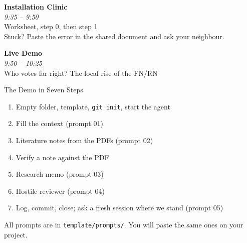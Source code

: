 \documentclass[svgnames,x11names,dvipsnames]{beamer}
\begin{document}

\begin{frame}[plain]
  \centering
  \vfill
  {\Huge \textbf{\textcolor{titleblue}{Installation Clinic}}}\\[0.4cm]
  {\Large \textit{9:35 -- 9:50}}\\[0.3cm]
  {\large Worksheet, step 0, then step 1}\\[0.4cm]
  {\small Stuck? Paste the error in the shared document and ask your neighbour.}
  \vfill
\end{frame}


\begin{frame}[plain]
  \centering
  \vfill
  {\Huge \textbf{\textcolor{titleblue}{Live Demo}}}\\[0.4cm]
  {\Large \textit{9:50 -- 10:25}}\\[0.3cm]
  {\large Who votes far right? The local rise of the FN/RN}
  \vfill
\end{frame}

\begin{frame}{The Demo in Seven Steps}

\vspace{0.1cm}
\begin{enumerate}
    \item Empty folder, template, \texttt{git init}, start the agent
    \item Fill the context (prompt 01)
    \item Literature notes from the PDFs (prompt 02)
    \item \alert{Verify a note against the PDF}
    \item Research memo (prompt 03)
    \item Hostile reviewer (prompt 04)
    \item Log, commit, close; ask a fresh session where we stand (prompt 05)
\end{enumerate}

\vspace{0.4cm}

{\small All prompts are in \texttt{template/prompts/}. You will paste the same ones on your project.}

\end{frame}
\end{document}
